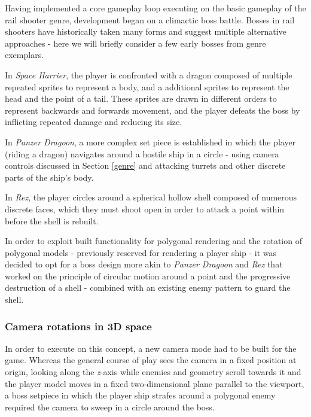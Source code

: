 \documentclass[11pt]{article}
\begin{document}

Having implemented a core gameplay loop executing on the basic gameplay of the rail shooter genre,
development began on a climactic boss battle. Bosses in rail shooters have historically taken many
forms and suggest multiple alternative approaches - here we will briefly consider a few early
bosses from genre exemplars. 

In \textit{Space Harrier}, the player is confronted with a dragon composed of multiple
repeated sprites to represent a body, and a additional sprites to represent the head and the
point of a tail. These sprites are drawn in different orders to represent backwards and forwards
movement, and the player defeats the boss by inflicting repeated damage and reducing its size.

In \textit{Panzer Dragoon}, a more complex set piece is established in which the player (riding a 
dragon) navigates around a hostile ship in a circle - using camera controls discussed in Section
\ref{genre} and attacking turrets and other discrete parts of the ship's body.

In \textit{Rez}, the player circles around a spherical hollow shell composed of numerous discrete
faces, which they must shoot open in order to attack a point within before the shell is rebuilt.

In order to exploit built functionality for polygonal rendering and the rotation of polygonal
models - previously reserved for rendering a player ship - it was decided to opt for a boss
design more akin to \textit{Panzer Dragoon} and \textit{Rez} that worked on the principle of
circular motion around a point and the progressive destruction of a shell - combined with an 
existing enemy pattern to guard the shell.

\subsubsection*{Camera rotations in 3D space}


In order to execute on this concept, a new camera mode had to be built for the game.
Whereas the general course of play sees the camera in a fixed position at origin, looking
along the \textit{z}-axis while enemies and geometry scroll towards it and the player
model moves in a fixed two-dimensional plane parallel to the viewport, a boss setpiece in
which the player ship strafes around a polygonal enemy required the camera to sweep in a 
circle around the boss.
\end{document}
